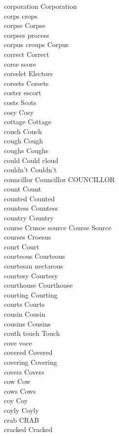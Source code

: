 corporation Corporation\\
corps crops\\
corpse Corpse\\
corpses process\\
corpus croups Corpus\\
correct Correct\\
corse score\\
corselet Electors\\
corsets Corsets\\
coster escort\\
costs Scots\\
cosy Cosy\\
cottage Cottage\\
couch Couch\\
cough Cough\\
coughs Coughs\\
could Could cloud\\
couldn't Couldn't\\
councillor Councillor COUNCILLOR\\
count Count\\
counted Counted\\
countess Countess\\
country Country\\
course Crusoe source Course Source\\
courses Croesus\\
court Court\\
courteous Courteous\\
courtesan nectarous\\
courtesy Courtesy\\
courthouse Courthouse\\
courting Courting\\
courts Courts\\
cousin Cousin\\
cousins Cousins\\
couth touch Touch\\
cove voce\\
covered Covered\\
covering Covering\\
covers Covers\\
cow Cow\\
cows Cows\\
coy Coy\\
coyly Coyly\\
crab CRAB\\
cracked Cracked\\
